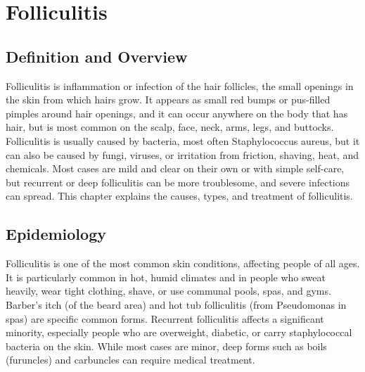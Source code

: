\chapter{Folliculitis}

\section*{Definition and Overview}
Folliculitis is inflammation or infection of the hair follicles, the small openings in the skin from which hairs grow. It appears as small red bumps or pus-filled pimples around hair openings, and it can occur anywhere on the body that has hair, but is most common on the scalp, face, neck, arms, legs, and buttocks. Folliculitis is usually caused by bacteria, most often Staphylococcus aureus, but it can also be caused by fungi, viruses, or irritation from friction, shaving, heat, and chemicals. Most cases are mild and clear on their own or with simple self-care, but recurrent or deep folliculitis can be more troublesome, and severe infections can spread. This chapter explains the causes, types, and treatment of folliculitis.

\section*{Epidemiology}
Folliculitis is one of the most common skin conditions, affecting people of all ages. It is particularly common in hot, humid climates and in people who sweat heavily, wear tight clothing, shave, or use communal pools, spas, and gyms. Barber's itch (of the beard area) and hot tub folliculitis (from Pseudomonas in spas) are specific common forms. Recurrent folliculitis affects a significant minority, especially people who are overweight, diabetic, or carry staphylococcal bacteria on the skin. While most cases are minor, deep forms such as boils (furuncles) and carbuncles can require medical treatment.

